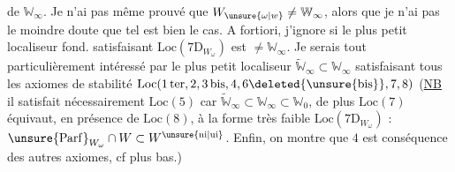  de $\mathbb W_\infty$. Je n'ai pas même prouvé que $W_{\unsure{\omega|w}}\ne\mathbb W_\infty$, alors que je n'ai pas le moindre doute que tel est bien le cas. A fortiori, j'ignore si le plus petit localiseur fond. satisfaisant $\mathrm{Loc}(7\mathrm{D}_{W_\omega})$\deleted{\unsure{,}} est $\ne\mathbb W_\infty$. Je serais tout particulièrement intéressé par le plus petit localiseur $\widetilde{\mathbb W}_\infty\subset\mathbb W_\infty$ satisfaisant tous les axiomes de stabilité $\mathrm{Loc}(1\,\mathrm{ter},2,3\,\mathrm{bis},4,6\deleted{\unsure{\mathrm{bis}}},7,8)$ (\uline{NB} il satisfait nécessairement $\mathrm{Loc}(5)$ car $\widetilde{\mathbb W}_\infty\subset\mathbb W_\infty\subset\mathbb W_0$\deleted{\unsure{)}}, de plus $\mathrm{Loc}(7)$ équivaut, en présence de $\mathrm{Loc}(8)$, à la forme très faible $\mathrm{Loc}(7\mathrm{D}_{W_\omega})$ : $\unsure{\mathrm{Parf}}_{W_\omega}\cap W\subset W^{\unsure{\mathrm{ni}|\mathrm{ui}}}$. Enfin, on montre que $4$ est conséquence des autres axiomes, cf plus bas.)

